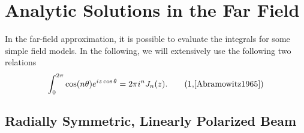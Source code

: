 \documentclass[11pt,SymmetricalJury]{inrsthesis/inrsthesis}
\begin{document}
\section{Analytic Solutions in the Far Field}
In the far-field approximation, it is possible to evaluate the integrals
for some simple field models. In the following, we will extensively use the
following two relations
  \begin{equation}
    \stepcounter{equation}
    \int_0^{2\pi} \cos(n\theta)e^{iz\cos\theta}= 2\pi i^n J_n(z). \tag{\theequation,\cite[\S9.1.21]{Abramowitz1965}}
    \label{eq:app.integral-bessel}
  \end{equation}

\subsection{Radially Symmetric, Linearly Polarized Beam}
\label{subsec:app.sc.analytic-expressions.linear}
\end{document}
